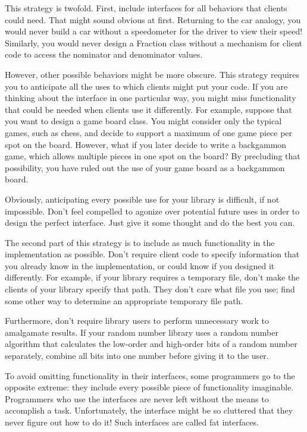 This strategy is twofold. First, include interfaces for all behaviors that clients could need. That might sound obvious at first. Returning to the car analogy, you would never build a car without a speedometer for the driver to view their speed! Similarly, you would never design a Fraction class without a mechanism for client code to access the nominator and denominator values.

However, other possible behaviors might be more obscure. This strategy requires you to anticipate all the uses to which clients might put your code. If you are thinking about the interface in one particular way, you might miss functionality that could be needed when clients use it differently. For example, suppose that you want to design a game board class. You might consider only the typical games, such as chess, and decide to support a maximum of one game piece per spot on the board. However, what if you later decide to write a backgammon game, which allows multiple pieces in one spot on the board? By precluding that possibility, you have ruled out the use of your game board as a backgammon board.

Obviously, anticipating every possible use for your library is difficult, if not impossible. Don’t feel compelled to agonize over potential future uses in order to design the perfect interface. Just give it some thought and do the best you can.

The second part of this strategy is to include as much functionality in the implementation as possible. Don’t require client code to specify information that you already know in the implementation, or could know if you designed it differently. For example, if your library requires a temporary file, don’t make the clients of your library specify that path. They don’t care what file you use; find some other way to determine an appropriate temporary file path.

Furthermore, don’t require library users to perform unnecessary work to amalgamate results. If your random number library uses a random number algorithm that calculates the low-order and high-order bits of a random number separately, combine all bits into one number before giving it to the user.


To avoid omitting functionality in their interfaces, some programmers go to the opposite extreme: they include every possible piece of functionality imaginable. Programmers who use the interfaces are never left without the means to accomplish a task. Unfortunately, the interface might be so cluttered that they never figure out how to do it! Such interfaces are called fat interfaces.

